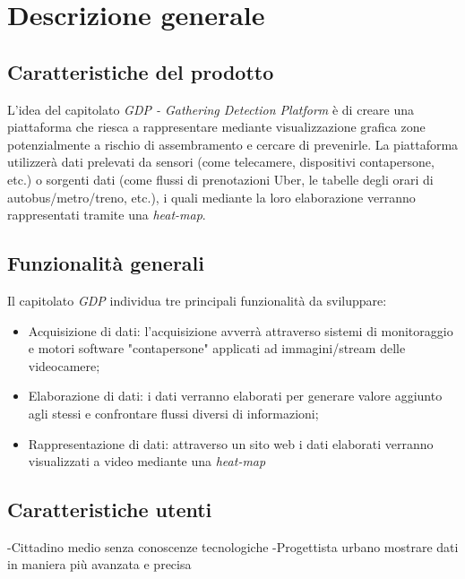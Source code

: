 \chapter{Descrizione generale}
\section{Caratteristiche del prodotto}
L'idea del capitolato \textit{GDP - Gathering Detection Platform} è di creare una piattaforma che riesca a rappresentare mediante visualizzazione grafica zone potenzialmente a rischio di assembramento e cercare di prevenirle.
La piattaforma utilizzerà dati prelevati da sensori (come telecamere, dispositivi contapersone, etc.) o sorgenti dati (come flussi di prenotazioni Uber, le tabelle degli orari di autobus/metro/treno, etc.), i quali mediante la loro elaborazione verranno rappresentati tramite una \textit{heat-map}.

\section{Funzionalità generali}
Il capitolato \textit{GDP} individua tre principali funzionalità da sviluppare:
\begin{itemize}
	\item Acquisizione di dati: l'acquisizione avverrà attraverso sistemi di monitoraggio e motori software "contapersone" applicati ad immagini/stream delle videocamere;
	\item Elaborazione di dati: i dati verranno elaborati per generare valore aggiunto agli stessi e confrontare flussi diversi di informazioni;
	\item Rappresentazione di dati: attraverso un sito web i dati elaborati verranno visualizzati a video mediante una \textit{heat-map}
\end{itemize}

\section{Caratteristiche utenti}
-Cittadino medio senza conoscenze tecnologiche
-Progettista urbano mostrare dati in maniera più avanzata e precisa